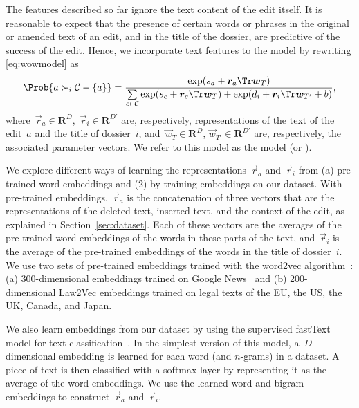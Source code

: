 The features described so far ignore the text content of the edit itself.
It is reasonable to expect that the presence of certain words or phrases in the original or amended text of an edit, and in the title of the dossier, are predictive of the success of the edit.
Hence, we incorporate text features to the \wow{} model by rewriting \eqref{eq:wowmodel} as
\begin{equation}
	\label{eq:wowtext}
	\Prob{ a \succ_i \mathcal{C} - \{ a\} } =\frac{\exp(s_a + \vec{r}_a \Tr \vec{w}_T  ) }{ \sum\limits_{c \in \mathcal{C} } \exp(s_c + \vec{r}_c\Tr \vec{w}_T) + \exp(d_i + \vec{r}_i \Tr \vec{w}_{T'} + b) },
\end{equation}
where~$\vec{r}_a\in \mathbf{R}^{D}$,~$\vec{r}_i \in \mathbf{R}^{D'}$  are, respectively, representations of the text of the edit~$a$ and the title of dossier~$i$, and~$\vec{w}_T  \in \mathbf{R}^{D}$, $\vec{w}_{T'}  \in \mathbf{R}^{D'}$ are, respectively, the associated parameter vectors.
We refer to this model as the  model (or ).

We explore different ways of learning the representations~$\vec{r}_a$ and~$\vec{r}_i$ from (a) pre-trained word embeddings and (2) by training embeddings on our dataset.
With pre-trained embeddings,~$\vec{r}_a$ is the concatenation of three vectors that are the representations of the deleted text, inserted text, and the context of the edit, as explained in Section~\ref{sec:dataset}.
Each of these vectors are the averages of the pre-trained word embeddings of the words in these parts of the text, and~$\vec{r}_i$ is the average of the pre-trained embeddings of the words in the title of dossier~$i$.
We use two sets of pre-trained embeddings trained with the word2vec algorithm~\cite{mikolov2013distributed}: (a) 300-dimensional embeddings trained on Google News~\cite{google2013word2vec} and (b) 200-dimensional Law2Vec embeddings trained on legal texts of the EU, the US, the UK, Canada, and Japan\cite{chalkidis2019deep}.

We also learn embeddings from our dataset by using the supervised fastText model for text classification~\cite{joulin2017bag}.
In the simplest version of this model, a~$D$-dimensional embedding is learned for each word (and $n$-grams) in a dataset.
A piece of text is then classified with a softmax layer by representing it as the average of the word embeddings.
We use the learned word and bigram embeddings to construct~$\vec{r}_a$ and~$\vec{r}_i$.

